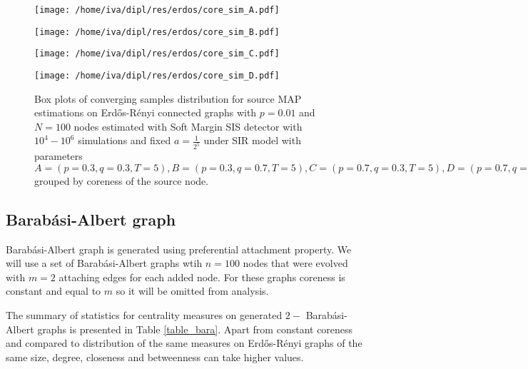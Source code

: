 \documentclass[times, utf8, diplomski]{fer}
\begin{document}
\begin{figure}[H]
\begin{minipage}{\textwidth}
\begin{minipage}{0.5\textwidth}
\texttt{[image: /home/iva/dipl/res/erdos/core\_sim\_A.pdf]}
\end{minipage}
\begin{minipage}{0.5\textwidth}
\texttt{[image: /home/iva/dipl/res/erdos/core\_sim\_B.pdf]}
\end{minipage}
\begin{minipage}{0.5\textwidth}
\texttt{[image: /home/iva/dipl/res/erdos/core\_sim\_C.pdf]}
\end{minipage}
\begin{minipage}{0.5\textwidth}
\texttt{[image: /home/iva/dipl/res/erdos/core\_sim\_D.pdf]}
\end{minipage}
\caption{Box plots of converging samples distribution for source MAP estimations on  Erd{\H{o}}s-R{\'{e}}nyi connected graphs with $p=0.01$ and $N=100$ nodes estimated with Soft Margin SIS detector with $10^4 - 10^6$ simulations and fixed $a = \frac{1}{2^5}$ under SIR model with parameters $A = (p=0.3, q=0.3, T=5), B = (p=0.3, q=0.7, T=5), C = (p=0.7, q=0.3, T=5), D = (p=0.7, q=0.7, T=5)$ grouped by coreness of the source node.}
\label{core_sim}
\end{minipage}
\end{figure}

\subsection{Barab\'{a}si-Albert graph}

Barab\'{a}si-Albert graph is generated using preferential attachment property. We will use a set of  Barab\'{a}si-Albert graphs wtih $n = 100$ nodes that were evolved with  $m = 2$ attaching edges for each added node. For these graphs coreness is constant and equal to $m$ so it will be  omitted from  analysis. 

The summary of statistics for centrality measures on generated $2-$ Barab\'{a}si-Albert graphs is presented in Table \ref{table_bara}. 
Apart from constant coreness and compared to distribution of the same measures on  Erd{\H{o}}s-R{\'{e}}nyi graphs of the same size, degree, closeness and betweenness can take higher values.
\end{document}
